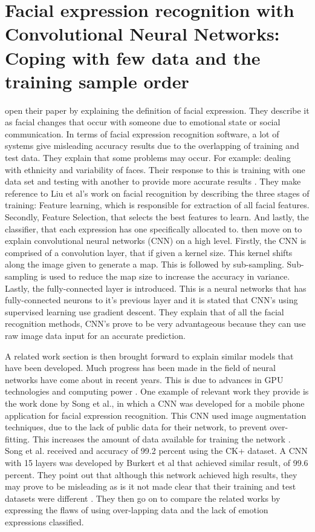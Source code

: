 \section{Facial expression recognition with Convolutional Neural Networks: Coping with few data and the training sample order}
\citeauthor{LOPES} open their paper by explaining the definition of facial expression. They describe it as facial changes that occur with someone due to emotional state or social communication. In terms of facial expression recognition software, a lot of systems give misleading accuracy results due to the overlapping of training and test data. They explain that some problems may occur. For example: dealing with ethnicity and variability of faces. Their response to this is training with one data set and testing with another to provide more accurate results \citep{LOPES}. They make reference to Liu et al's work on facial recognition by describing the three stages of training: Feature learning, which is responsible for extraction of all facial features. Secondly, Feature Selection, that selects the best features to learn. And lastly, the classifier, that each expression has one specifically allocated to. \citeauthor{LOPES} then move on to explain convolutional neural networks (CNN) on a high level. Firstly, the CNN is comprised of a convolution layer, that if given a kernel size. This kernel shifts along the image given to generate a map. This is followed by sub-sampling. Sub-sampling is used to reduce the map size to increase the accuracy in variance. Lastly, the fully-connected layer is introduced. This is a neural networks that has fully-connected neurons to it's previous layer \citep{LOPES} and it is stated that CNN's using supervised learning use gradient descent. They explain that of all the facial recognition methods, CNN's prove to be very advantageous because they can use raw image data input for an accurate prediction. 

A related work section is then brought forward to explain similar models that have been developed. Much progress has been made in the field of neural networks have come about in recent years. This is due to advances in GPU technologies and computing power \cite{LOPES}. One example of relevant work they provide is the work done by Song et al., in which a CNN was developed for a mobile phone application for facial expression recognition. This CNN used image augmentation techniques, due to the lack of public data for their network, to prevent over-fitting. This increases the amount of data available for training the network \citep{LOPES}. Song et al. received and accuracy of 99.2 percent using the CK+ dataset. A CNN with 15 layers was developed by Burkert et al that achieved similar result, of 99.6 percent. They point out that although this network achieved high results, they may prove to be misleading as is it not made clear that their training and test datasets were different \citep{LOPES}. They then go on to compare the related works by expressing the flaws of using over-lapping data and the lack of emotion expressions classified.  

